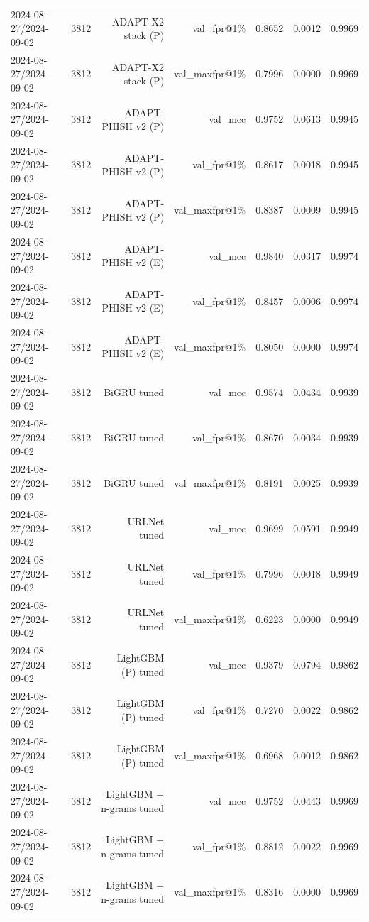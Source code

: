 \begin{table}[t]
\begin{tabular}{llrrrrr}
2024-08-27/2024-09-02 & 3812 & ADAPT-X2 stack (P) & val\_fpr@1\% & 0.8652 & 0.0012 & 0.9969 \\
2024-08-27/2024-09-02 & 3812 & ADAPT-X2 stack (P) & val\_maxfpr@1\% & 0.7996 & 0.0000 & 0.9969 \\
2024-08-27/2024-09-02 & 3812 & ADAPT-PHISH v2 (P) & val\_mcc & 0.9752 & 0.0613 & 0.9945 \\
2024-08-27/2024-09-02 & 3812 & ADAPT-PHISH v2 (P) & val\_fpr@1\% & 0.8617 & 0.0018 & 0.9945 \\
2024-08-27/2024-09-02 & 3812 & ADAPT-PHISH v2 (P) & val\_maxfpr@1\% & 0.8387 & 0.0009 & 0.9945 \\
2024-08-27/2024-09-02 & 3812 & ADAPT-PHISH v2 (E) & val\_mcc & 0.9840 & 0.0317 & 0.9974 \\
2024-08-27/2024-09-02 & 3812 & ADAPT-PHISH v2 (E) & val\_fpr@1\% & 0.8457 & 0.0006 & 0.9974 \\
2024-08-27/2024-09-02 & 3812 & ADAPT-PHISH v2 (E) & val\_maxfpr@1\% & 0.8050 & 0.0000 & 0.9974 \\
2024-08-27/2024-09-02 & 3812 & BiGRU tuned & val\_mcc & 0.9574 & 0.0434 & 0.9939 \\
2024-08-27/2024-09-02 & 3812 & BiGRU tuned & val\_fpr@1\% & 0.8670 & 0.0034 & 0.9939 \\
2024-08-27/2024-09-02 & 3812 & BiGRU tuned & val\_maxfpr@1\% & 0.8191 & 0.0025 & 0.9939 \\
2024-08-27/2024-09-02 & 3812 & URLNet tuned & val\_mcc & 0.9699 & 0.0591 & 0.9949 \\
2024-08-27/2024-09-02 & 3812 & URLNet tuned & val\_fpr@1\% & 0.7996 & 0.0018 & 0.9949 \\
2024-08-27/2024-09-02 & 3812 & URLNet tuned & val\_maxfpr@1\% & 0.6223 & 0.0000 & 0.9949 \\
2024-08-27/2024-09-02 & 3812 & LightGBM (P) tuned & val\_mcc & 0.9379 & 0.0794 & 0.9862 \\
2024-08-27/2024-09-02 & 3812 & LightGBM (P) tuned & val\_fpr@1\% & 0.7270 & 0.0022 & 0.9862 \\
2024-08-27/2024-09-02 & 3812 & LightGBM (P) tuned & val\_maxfpr@1\% & 0.6968 & 0.0012 & 0.9862 \\
2024-08-27/2024-09-02 & 3812 & LightGBM + n-grams tuned & val\_mcc & 0.9752 & 0.0443 & 0.9969 \\
2024-08-27/2024-09-02 & 3812 & LightGBM + n-grams tuned & val\_fpr@1\% & 0.8812 & 0.0022 & 0.9969 \\
2024-08-27/2024-09-02 & 3812 & LightGBM + n-grams tuned & val\_maxfpr@1\% & 0.8316 & 0.0000 & 0.9969 \\

\end{tabular}
\end{table}
